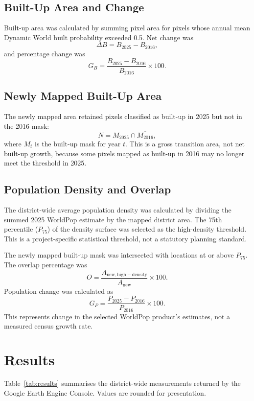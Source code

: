 \documentclass[conference]{IEEEtran}
\begin{document}
\subsection{Built-Up Area and Change}
Built-up area was calculated by summing pixel area for pixels whose annual mean Dynamic World built probability exceeded 0.5. Net change was
\begin{equation}
\Delta B=B_{2025}-B_{2016},
\end{equation}
and percentage change was
\begin{equation}
G_B=\frac{B_{2025}-B_{2016}}{B_{2016}}\times100.
\end{equation}

\subsection{Newly Mapped Built-Up Area}
The newly mapped area retained pixels classified as built-up in 2025 but not in the 2016 mask:
\begin{equation}
N=M_{2025}\cap\overline{M_{2016}},
\end{equation}
where $M_t$ is the built-up mask for year $t$. This is a gross transition area, not net built-up growth, because some pixels mapped as built-up in 2016 may no longer meet the threshold in 2025.

\subsection{Population Density and Overlap}
The district-wide average population density was calculated by dividing the summed 2025 WorldPop estimate by the mapped district area. The 75th percentile ($P_{75}$) of the density surface was selected as the high-density threshold. This is a project-specific statistical threshold, not a statutory planning standard.

The newly mapped built-up mask was intersected with locations at or above $P_{75}$. The overlap percentage was
\begin{equation}
O=\frac{A_{\mathrm{new, high-density}}}{A_{\mathrm{new}}}\times100.
\end{equation}
Population change was calculated as
\begin{equation}
G_P=\frac{P_{2025}-P_{2016}}{P_{2016}}\times100.
\end{equation}
This represents change in the selected WorldPop product's estimates, not a measured census growth rate.

\section{Results}
Table~\ref{tab:results} summarises the district-wide measurements returned by the Google Earth Engine Console. Values are rounded for presentation.
\end{document}
